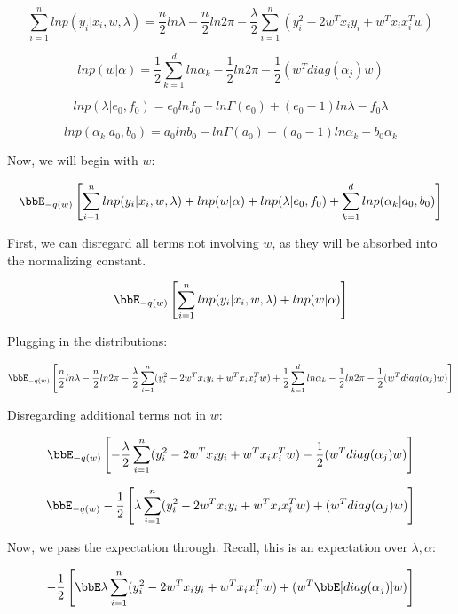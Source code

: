 \documentclass[twoside,11pt]{homework}
\begin{document}
\begin{equation}
 \sum_{i=1}^n  ln p(y_i | x_i, w, \lambda) = 
 \frac{n}{2}ln\lambda - \frac{n}{2}ln2\pi - \frac{\lambda}{2} \sum_{i=1}^n(y_i^2 - 2w^Tx_iy_i + w^Tx_ix_i^Tw)
\end{equation}

\begin{equation}
ln p(w | \alpha) =
 \frac{1}{2}\sum_{k=1}^dln\alpha_k - \frac{1}{2}ln2\pi - \frac{1}{2}(w^Tdiag(\alpha_j)w)
\end{equation}

\begin{equation}
ln p(\lambda | e_0, f_0) =
e_0lnf_0 - ln\Gamma(e_0) + (e_0 - 1)ln\lambda - f_0\lambda
\end{equation}

\begin{equation}
ln p(\alpha_k | a_0, b_0) =
a_0lnb_0 - ln\Gamma(a_0) + (a_0 - 1)ln\alpha_k - b_0\alpha_k
\end{equation}

Now, we will begin with $w$:

\[
\bbE_{-q(w)} \Brackets{
 \sum_{i=1}^n  ln p(y_i | x_i, w, \lambda) + ln p(w | \alpha)
+ ln p(\lambda | e_0, f_0) + \sum_{k=1}^d ln p(\alpha_k | a_0, b_0)
}
\]

First, we can disregard all terms not involving $w$, as they will be absorbed into the normalizing constant.

\[
\bbE_{-q(w)} \Brackets{
 \sum_{i=1}^n  ln p(y_i | x_i, w, \lambda) + ln p(w | \alpha)
}
\]

Plugging in the distributions:

\[
\bbE_{-q(w)} \Brackets{
 \frac{n}{2}ln\lambda - \frac{n}{2}ln2\pi - \frac{\lambda}{2} \sum_{i=1}^n(y_i^2 - 2w^Tx_iy_i + w^Tx_ix_i^Tw)
 +  \frac{1}{2}\sum_{k=1}^dln\alpha_k - \frac{1}{2}ln2\pi - \frac{1}{2}(w^Tdiag(\alpha_j)w)
}
\]

Disregarding additional terms not in $w$:

\[
\bbE_{-q(w)} \Brackets{
- \frac{\lambda}{2} \sum_{i=1}^n(y_i^2 - 2w^Tx_iy_i + w^Tx_ix_i^Tw)
 - \frac{1}{2}(w^Tdiag(\alpha_j)w)
}
\]

\[
\bbE_{-q(w)} - \frac{1}{2}  \Brackets{
\lambda \sum_{i=1}^n(y_i^2 - 2w^Tx_iy_i + w^Tx_ix_i^Tw)
+ (w^Tdiag(\alpha_j)w)
}
\]

Now, we pass the expectation through. Recall, this is an expectation over $\lambda, \alpha$:

\[
- \frac{1}{2}  \Brackets{
\bbE\lambda \sum_{i=1}^n(y_i^2 - 2w^Tx_iy_i + w^Tx_ix_i^Tw)
+ (w^T\bbE[diag(\alpha_j)]w)
}
\]
\end{document}
